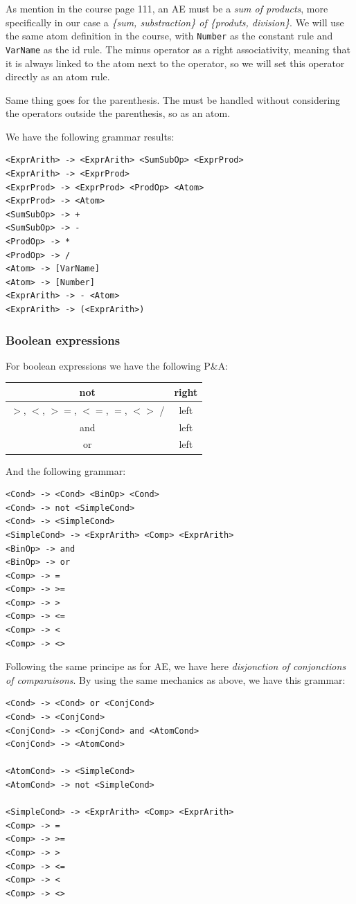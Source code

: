 \documentclass[letterpaper]{article}
\begin{document}
As mention in the course page 111, an AE must be a \textit{sum of products},
more specifically in our case a \textit{\{sum, substraction\}
of \{produts, division\}}. We will use the same atom definition in the course,
with \texttt{Number} as the constant rule and \texttt{VarName} as the id rule.
The minus operator as a right associativity, meaning that it is always linked
to the atom next to the operator, so we will set this operator directly as
an atom rule.

Same thing goes for the parenthesis. The must be handled without considering
the operators outside the parenthesis, so as an atom.

We have the following grammar results:

\begin{lstlisting}
<ExprArith> -> <ExprArith> <SumSubOp> <ExprProd>
<ExprArith> -> <ExprProd>
<ExprProd> -> <ExprProd> <ProdOp> <Atom>
<ExprProd> -> <Atom>
<SumSubOp> -> +
<SumSubOp> -> -
<ProdOp> -> *
<ProdOp> -> /
<Atom> -> [VarName]
<Atom> -> [Number]
<ExprArith> -> - <Atom>
<ExprArith> -> (<ExprArith>)
\end{lstlisting}


\subsubsection{Boolean expressions}

For boolean expressions we have the following P\&A:


\begin{tabular}{|c|c|}
    \hline
    not & right \\
    \hline
    $>$, $<$, $>=$, $<=$, $=$, $<>$ / & left \\
    \hline
    and & left \\
    \hline
    or & left \\
    \hline
\end{tabular}

And the following grammar:

\begin{lstlisting}
<Cond> -> <Cond> <BinOp> <Cond>
<Cond> -> not <SimpleCond>
<Cond> -> <SimpleCond>
<SimpleCond> -> <ExprArith> <Comp> <ExprArith>
<BinOp> -> and
<BinOp> -> or
<Comp> -> =
<Comp> -> >=
<Comp> -> >
<Comp> -> <=
<Comp> -> <
<Comp> -> <>
\end{lstlisting}

Following the same principe as for AE, we have here
\textit{disjonction of conjonctions of comparaisons}. By using the same
mechanics as above, we have this grammar:


\begin{lstlisting}
<Cond> -> <Cond> or <ConjCond>
<Cond> -> <ConjCond>
<ConjCond> -> <ConjCond> and <AtomCond>
<ConjCond> -> <AtomCond>

<AtomCond> -> <SimpleCond>
<AtomCond> -> not <SimpleCond>

<SimpleCond> -> <ExprArith> <Comp> <ExprArith>
<Comp> -> =
<Comp> -> >=
<Comp> -> >
<Comp> -> <=
<Comp> -> <
<Comp> -> <>

\end{lstlisting}
\end{document}
